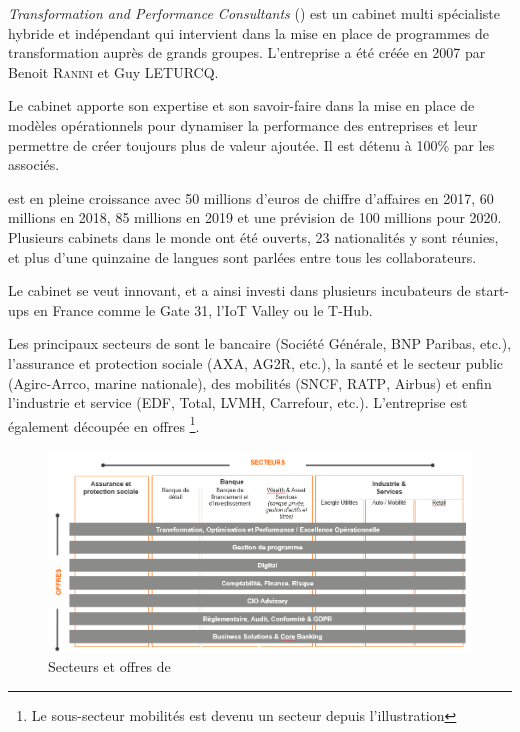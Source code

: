 \emph{Transformation and Performance Consultants} (\entreprise) est un cabinet \og multi spécialiste \fg hybride et indépendant qui intervient dans la mise en place de programmes de transformation auprès de grands groupes.
L'entreprise a été créée en 2007 par Benoit \textsc{Ranini} et Guy \textsc{LETURCQ}.

Le cabinet apporte son expertise et son savoir-faire dans la mise en place de modèles opérationnels pour dynamiser la performance des entreprises et leur permettre de créer toujours plus de valeur ajoutée. Il est détenu à 100\% par les associés.

\entreprise est en pleine croissance avec 50 millions d’euros de chiffre d’affaires en 2017, 60 millions en 2018, 85 millions en 2019 et une prévision de 100 millions pour 2020.
Plusieurs cabinets dans le monde ont été ouverts, 23 nationalités y sont réunies, et plus d'une quinzaine de langues sont parlées entre tous les collaborateurs. 

Le cabinet se veut innovant, et a ainsi investi dans plusieurs incubateurs de start-ups en France comme le Gate 31, l'IoT Valley ou le T-Hub.

Les principaux secteurs de \entreprise sont le bancaire (Société Générale, \textsc{BNP} Paribas, etc.), l'assurance et protection sociale (\textsc{AXA}, \textsc{AG2R}, etc.), la santé et le secteur public (Agirc-Arrco, marine nationale), des mobilités (\textsc{SNCF}, \textsc{RATP}, Airbus) et enfin l'industrie et service (\textsc{EDF}, Total, \textsc{LVMH}, Carrefour, etc.).
L'entreprise est également découpée en offres
\footnote{Le sous-secteur mobilités est devenu un secteur depuis l'illustration}.

\begin{figure}[H]
    \centering
    \includegraphics[width=1\linewidth]{img/tnp_secteurs_offres.png}
    \caption{Secteurs et offres de \entreprise{}  }
\end{figure}

